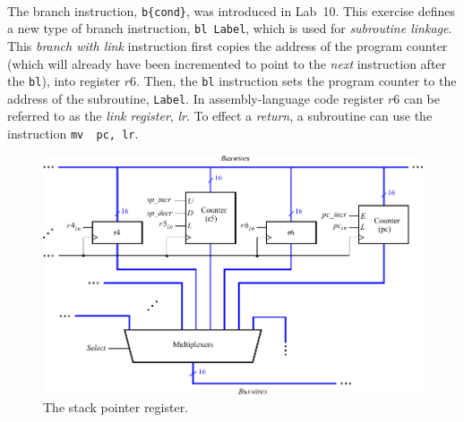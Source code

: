 \documentclass[epsfig,10pt,fullpage]{article} \addtolength{\textwidth}{1.5in}
\begin{document}
~\\
\noindent
The branch instruction, \texttt{b\{cond\}}, was introduced in Lab~10. This exercise defines a new
type of branch instruction, \texttt{bl Label},  which is used for {\it subroutine linkage}.
This {\it branch with link} instruction first copies the address of the program counter 
(which will already have been incremented to point to the {\it next} instruction after 
the \texttt{bl}), into register $r6$. Then, the \texttt{bl} instruction sets the program 
counter to the address of the subroutine, \texttt{Label}. 
In assembly-language code register $r6$ can be referred to as the {\it link register}, {\it lr}. 
To effect a {\it return}, a subroutine can use the instruction \texttt{mv~~pc, lr}.

\begin{figure}[t]
\begin{center}
\includegraphics[scale = 0.8]{figures/r6.pdf}
\end{center}
\caption{The stack pointer register.}
\label{fig:figr6}
\end{figure}
\end{document}
